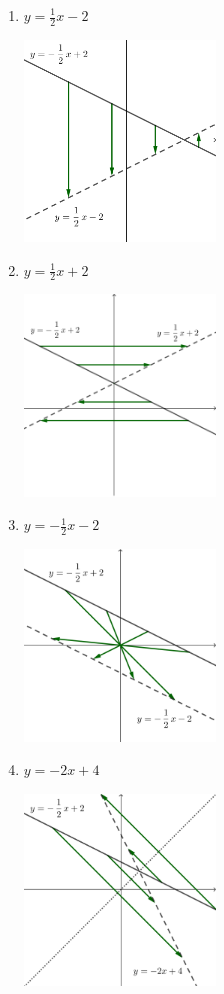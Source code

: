 \documentclass{oblivoir}
\begin{document}
\begin{multicols*}{2}
\newpage
%
\begin{enumerate}
\item
\(y=\frac12x-2\)
\begin{center}
\includegraphics[width=0.4\textwidth]{rreflect_7-1}
\end{center}
\item
\(y=\frac12x+2\)
\begin{center}
\includegraphics[width=0.4\textwidth]{rreflect_7-2}
\end{center}
\vfill\null\columnbreak
\item
\(y=-\frac12x-2\)
\begin{center}
\includegraphics[width=0.4\textwidth]{rreflect_7-3}
\end{center}
\item
\(y=-2x+4\)
\begin{center}
\includegraphics[width=0.4\textwidth]{rreflect_7-4}
\end{center}
\end{enumerate}
\end{multicols*}
\end{document}
